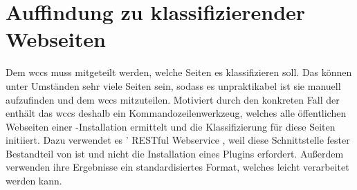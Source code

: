 \section{Auffindung zu klassifizierender Webseiten}
    \label{section:conceptCrawler}
    Dem \gls{wccs} muss mitgeteilt werden, welche Seiten es klassifizieren soll.
    Das können unter Umständen sehr viele Seiten sein,
    sodass es unpraktikabel ist sie manuell aufzufinden
    und dem \gls{wccs} mitzuteilen.
    Motiviert durch den konkreten Fall der {\fernUni} enthält das \gls{wccs}
    deshalb ein Kommandozeilenwerkzeug, welches alle öffentlichen Webseiten einer
    {\wordpress}-Installation ermittelt und die Klassifizierung für diese Seiten initiiert.
    Dazu verwendet es {\wordpress}' RESTful Webservice \cite{wordpress:RestAPI},
    weil diese Schnittstelle fester Bestandteil von {\wordpress} ist und nicht die
    Installation eines Plugins erfordert.
    Außerdem verwenden ihre Ergebnisse ein standardisiertes Format,
    welches leicht verarbeitet werden kann.

